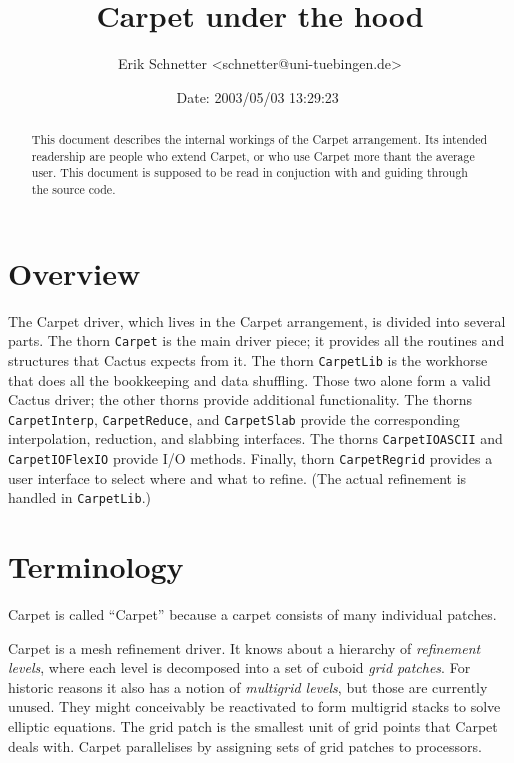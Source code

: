 \documentclass{article}
\begin{document}
\title{Carpet under the hood}
\author{Erik Schnetter \textless schnetter@uni-tuebingen.de\textgreater}
\date{$ $Date: 2003/05/03 13:29:23 $ $}
\maketitle

\begin{abstract}
   This document describes the internal workings of the Carpet
   arrangement.  Its intended readership are people who extend Carpet,
   or who use Carpet more thant the average user.  This document is
   supposed to be read in conjuction with and guiding through the
   source code.
\end{abstract}

\tableofcontents

\section{Overview}

   The Carpet driver, which lives in the Carpet arrangement, is
   divided into several parts.  The thorn \texttt{Carpet} is the main
   driver piece; it provides all the routines and structures that
   Cactus expects from it.  The thorn \texttt{CarpetLib} is the
   workhorse that does all the bookkeeping and data shuffling.  Those
   two alone form a valid Cactus driver; the other thorns provide
   additional functionality.  The thorns \texttt{CarpetInterp},
   \texttt{CarpetReduce}, and \texttt{CarpetSlab} provide the
   corresponding interpolation, reduction, and slabbing interfaces.
   The thorns \texttt{CarpetIOASCII} and \texttt{CarpetIOFlexIO}
   provide I/O methods.  Finally, thorn \texttt{CarpetRegrid} provides
   a user interface to select where and what to refine.  (The actual
   refinement is handled in \texttt{CarpetLib}.)



\section{Terminology}

   Carpet is called ``Carpet'' because a carpet consists of many
   individual patches.

   Carpet is a mesh refinement driver.  It knows about a hierarchy of
   \emph{refinement levels}, where each level is decomposed into a set
   of cuboid \emph{grid patches}.  For historic reasons it also has a
   notion of \emph{multigrid levels}, but those are currently unused.
   They might conceivably be reactivated to form multigrid stacks to
   solve elliptic equations.  The grid patch is the smallest unit of
   grid points that Carpet deals with.  Carpet parallelises by
   assigning sets of grid patches to processors.
\end{document}
